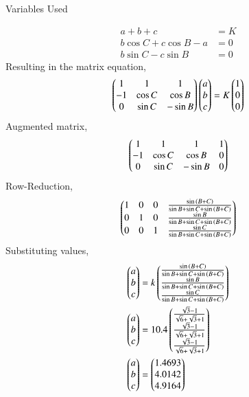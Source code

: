 \documentclass[journal]{IEEEtran}
\begin{document}
\solution
\begin{table}[h!]    
  \centering
  
  \caption{Variables Used}
  \label{tab3.2.19.1}
\end{table}
\begin{align}
    a+b+c&=K \\
    b\cos{C}+c\cos{B}-a&=0 \\
    b\sin{C}-c\sin{B}&=0
\end{align}
Resulting in the matrix equation,
\begin{align}
    \begin{pmatrix}1&1&1\\-1&\cos{C}&\cos{B}\\0&\sin{C}&-\sin{B}\end{pmatrix}\begin{pmatrix}a\\b\\c\end{pmatrix}=K\begin{pmatrix}1\\0\\0\end{pmatrix}
\end{align}
Augmented matrix,
\begin{align}
    \begin{pmatrix}1&1&1&1\\-1&\cos{C}&\cos{B}&0\\0&\sin{C}&-\sin{B}&0\end{pmatrix}
\end{align}
Row-Reduction,
\begin{align}
    \begin{pmatrix}1&0&0&\frac{\sin{\ensuremath{\left(B+C\right)}}}{\sin{B}+\sin{C}+\sin{\ensuremath{\left(B+C\right)}}}\\0&1&0&\frac{\sin{B}}{\sin{B}+\sin{C}+\sin{\ensuremath{\left(B+C\right)}}}\\0&0&1&\frac{\sin{C}}{\sin{B}+\sin{C}+\sin{\ensuremath{\left(B+C\right)}}}\end{pmatrix}
\end{align}
Substituting values,
\begin{align}
    \begin{pmatrix}a\\b\\c\end{pmatrix}&=k\begin{pmatrix}\frac{\sin{\ensuremath{\left(B+C\right)}}}{\sin{B}+\sin{C}+\sin{\ensuremath{\left(B+C\right)}}}\\\frac{\sin{B}}{\sin{B}+\sin{C}+\sin{\ensuremath{\left(B+C\right)}}}\\\frac{\sin{C}}{\sin{B}+\sin{C}+\sin{\ensuremath{\left(B+C\right)}}}\end{pmatrix} \\
    \begin{pmatrix}a\\b\\c\end{pmatrix}&=10.4\begin{pmatrix}\frac{\sqrt{3}-1}{\sqrt{6}+\sqrt{3}+1}\\\frac{\sqrt{3}-1}{\sqrt{6}+\sqrt{3}+1}\\\frac{\sqrt{3}-1}{\sqrt{6}+\sqrt{3}+1}\end{pmatrix} \\
    \begin{pmatrix}a\\b\\c\end{pmatrix}&=\begin{pmatrix}1.4693\\4.0142\\4.9164\end{pmatrix}
\end{align}
\end{document}
